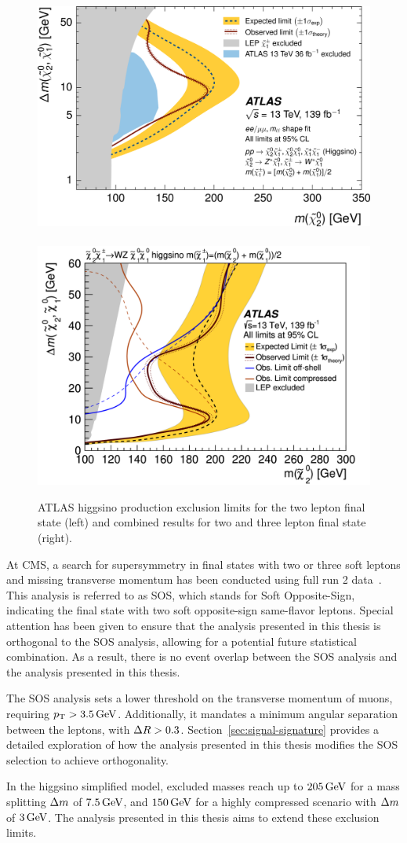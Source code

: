 \begin{figure}[!htb]
\centering
\includegraphics[width=0.48\linewidth]{plots/prev_results/ATLAS_1911_12606.png} \,
\includegraphics[width=0.48\linewidth]{plots/prev_results/ATLAS-Higgsino-combined_2106_01676.png}  \\
\caption[ATLAS higgsino production exclusion limits]{ATLAS higgsino production exclusion limits for the two lepton final state (left) and combined results for two and three lepton final state (right).}
\label{fig:atlas-limits}
\end{figure}

At CMS, a search for supersymmetry in final states with two or three soft leptons and missing transverse momentum has been conducted using full run 2 data~\cite{sos}. This analysis is referred to as SOS, which stands for Soft Opposite-Sign, indicating the final state with two soft opposite-sign same-flavor leptons. Special attention has been given to ensure that the analysis presented in this thesis is orthogonal to the SOS analysis, allowing for a potential future statistical combination. As a result, there is no event overlap between the SOS analysis and the analysis presented in this thesis.

The SOS analysis sets a lower threshold on the transverse momentum of muons, requiring $p_{\mathrm{T}} > 3.5\,\text{Ge\hspace{-.08em}V}$. Additionally, it mandates a minimum angular separation between the leptons, with $\Delta R>0.3$. Section~\ref{sec:signal-signature} provides a detailed exploration of how the analysis presented in this thesis modifies the SOS selection to achieve orthogonality.

In the higgsino simplified model, excluded masses reach up to $205 \,\text{Ge\hspace{-.08em}V}$ for a mass splitting $\Delta m$ of $7.5 \,\text{Ge\hspace{-.08em}V}$, and $150 \,\text{Ge\hspace{-.08em}V}$ for a highly compressed scenario with $\Delta m$ of $3 \,\text{Ge\hspace{-.08em}V}$. The analysis presented in this thesis aims to extend these exclusion limits.

